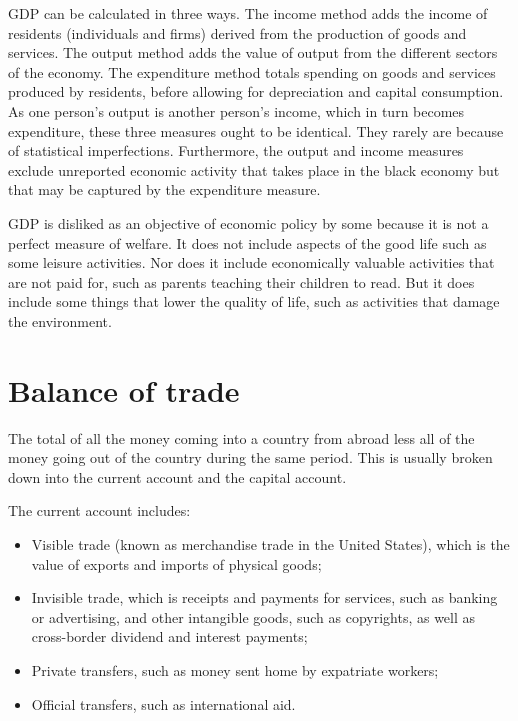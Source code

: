 \documentclass[11pt,]{book}
\providecommand{\tightlist}{%
  \setlength{\itemsep}{0pt}\setlength{\parskip}{0pt}}
\theoremstyle{definition}
\theoremstyle{definition}
\theoremstyle{definition}
\theoremstyle{remark}
\begin{document}
GDP can be calculated in three ways. The income method adds the income
of residents (individuals and firms) derived from the production of
goods and services. The output method adds the value of output from the
different sectors of the economy. The expenditure method totals spending
on goods and services produced by residents, before allowing for
depreciation and capital consumption. As one person's output is another
person's income, which in turn becomes expenditure, these three measures
ought to be identical. They rarely are because of statistical
imperfections. Furthermore, the output and income measures exclude
unreported economic activity that takes place in the black economy but
that may be captured by the expenditure measure.

GDP is disliked as an objective of economic policy by some because it is
not a perfect measure of welfare. It does not include aspects of the
good life such as some leisure activities. Nor does it include
economically valuable activities that are not paid for, such as parents
teaching their children to read. But it does include some things that
lower the quality of life, such as activities that damage the
environment.

\section{Balance of trade}\label{balance-of-trade}

The total of all the money coming into a country from abroad less all of
the money going out of the country during the same period. This is
usually broken down into the current account and the capital account.

The current account includes:

\begin{itemize}
\tightlist
\item
  Visible trade (known as merchandise trade in the United States), which
  is the value of exports and imports of physical goods;
\item
  Invisible trade, which is receipts and payments for services, such as
  banking or advertising, and other intangible goods, such as
  copyrights, as well as cross-border dividend and interest payments;
\item
  Private transfers, such as money sent home by expatriate workers;
\item
  Official transfers, such as international aid.
\end{itemize}
\end{document}
